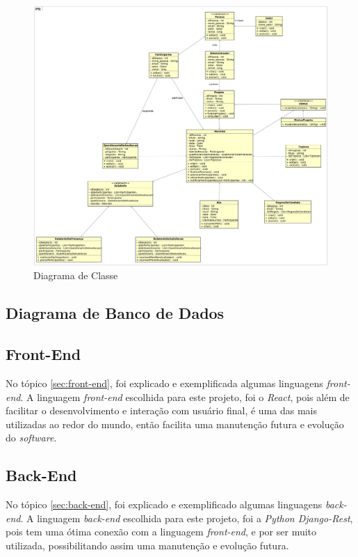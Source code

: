 \begin{figure}[H]
	\centering
	\includegraphics[width=1.0\textwidth]{figuras/diagramaDeClasse.png}
	\caption{Diagrama de Classe}
	\label{img:diagrama_de_classe}
\end{figure}

\subsection{Diagrama de Banco de Dados}



\subsection{Front-End}

No tópico \ref{sec:front-end}, foi explicado e exemplificada algumas linguagens \textit{front-end}. A linguagem \textit{front-end} escolhida para este projeto, foi o \textit{React}, pois além de facilitar o desenvolvimento e interação com usuário final, é uma das mais utilizadas ao redor do mundo, então facilita uma manutenção futura e evolução do \textit{software}.

\subsection{Back-End}

No tópico \ref{sec:back-end}, foi explicado e exemplificado algumas linguagens \textit{back-end}. A linguagem \textit{back-end} escolhida para este projeto, foi a \textit{Python Django-Rest}, pois tem uma ótima conexão com a linguagem \textit{front-end}, e por ser muito utilizada, possibilitando assim uma manutenção e evolução futura.

